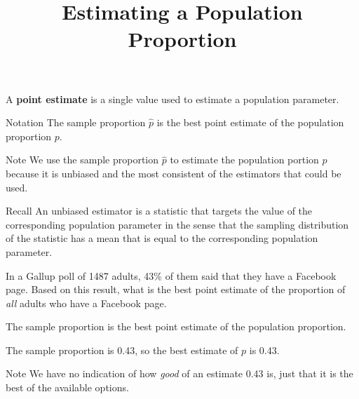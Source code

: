 \documentclass{beamer}
\title[MA205 - Section 7.1]{Estimating a Population Proportion}
\begin{document}
\begin{frame}
\titlepage
\end{frame}

\begin{frame}
\begin{definition}
A \textbf{point estimate} is a single value used to estimate a population parameter.
\end{definition}\pause

\begin{block}{Notation}
The sample proportion $\hat{p}$ is the best point estimate of the population proportion $p$.
\end{block}\pause

\begin{block}{Note}
We use the sample proportion $\hat{p}$ to estimate the population portion $p$ because it is unbiased and the most consistent of the estimators that could be used.
\end{block}\pause

\begin{block}{Recall}
An unbiased estimator is a statistic that targets the value of the corresponding population parameter in the sense that the sampling distribution of the statistic has a mean that is equal to the corresponding population parameter.
\end{block}
\end{frame}

\begin{frame}
\begin{example}
In a Gallup poll of 1487 adults, 43\% of them said that they have a Facebook page. Based on this result, what is the best point estimate of the proportion of \emph{all} adults who have a Facebook page.\pause

\vspace{2mm}
The sample proportion is the best point estimate of the population proportion.\pause

\vspace{2mm}
The sample proportion is 0.43, so the best estimate of $p$ is 0.43.
\end{example}\pause

\begin{block}{Note}
We have no indication of how \emph{good} of an estimate 0.43 is, just that it is the best of the available options.
\end{block}
\end{frame}
\end{document}
